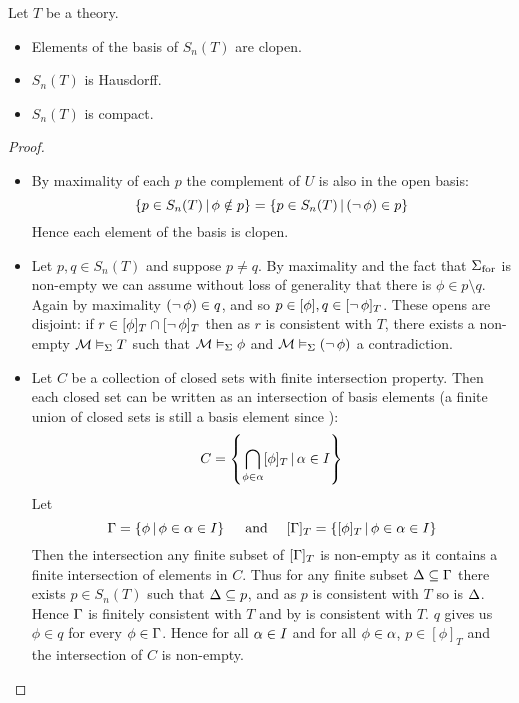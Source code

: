 \begin{prop}
    Let $T$ be a theory.
    \begin{itemize}
        \item Elements of the basis of $S_n(T)$ are clopen.
        \item $S_n(T)$ is Hausdorff.
        \item $S_n(T)$ is compact.
    \end{itemize}
\end{prop}
\begin{proof}~
\begin{itemize}
    \item By maximality of each $p$ the complement of $U$ is also 
        in the open basis:
        \[  
            \left\{p \in S_n(T) \,|\, \phi \notin p\right\}
            = \left\{p \in S_n(T) \,|\, (\neg\, \phi) \in p\right\}
        \]
        Hence each element of the basis is clopen.
    \item Let $p,q \in S_n(T)$ and suppose $p \ne q$. 
        By maximality and the fact that ${\Sigma}_\mathrm{for}$ is non-empty we can assume
        without loss of generality that there is $\phi \in p \setminus q$.
        Again by maximality $(\neg\, \phi) \in q$, 
        and so $p \in [\phi], q \in [\neg\, \phi]_T$.
        These opens are disjoint:
        if $r \in [\phi]_T \cap [\neg\, \phi]_T$ then as 
        $r$ is consistent with $T$, there exists a non-empty 
        $\mathcal{M} \vDash_{\Sigma} T$ such that 
        $\mathcal{M} \vDash_{\Sigma} \phi$ and $\mathcal{M} \vDash_{\Sigma}(\neg\, \phi)$
        a contradiction. 
    \item Let $C$ be a collection of closed sets with finite intersection
        property.
        Then each closed set can be written as an intersection of
        basis elements (a finite union of closed sets is still a basis element
        since ):
        \[C = \left\{\bigcap_{\phi \in \alpha}[\phi]_T \,|\, \alpha \in I\right\}\]
        Let 
        \[\Gamma = \left\{\phi \,|\, \phi \in \alpha \in I\right\} \quad 
        \text{ and } \quad [\Gamma]_T = \left\{[\phi]_T \,|\, \phi \in \alpha \in I\right\}\]
        Then the intersection any finite subset of $[\Gamma]_T$ is non-empty as it
        contains a finite intersection of elements in $C$.
        Thus for any finite subset $\Delta \subseteq \Gamma$ 
        there exists $p \in S_n(T)$ such that $\Delta \subseteq p$,
        and as $p$ is consistent with $T$ so is $\Delta$.
        Hence $\Gamma$ is finitely consistent with $T$ and by 
         is consistent with $T$.
         $q$ gives us $\phi \in q$ for every $\phi \in \Gamma$.
        Hence for all $\alpha \in I$ and for all $\phi \in \alpha$, $p \in [\phi]_T$
        and the intersection of $C$ is non-empty.
\end{itemize}\end{proof}

